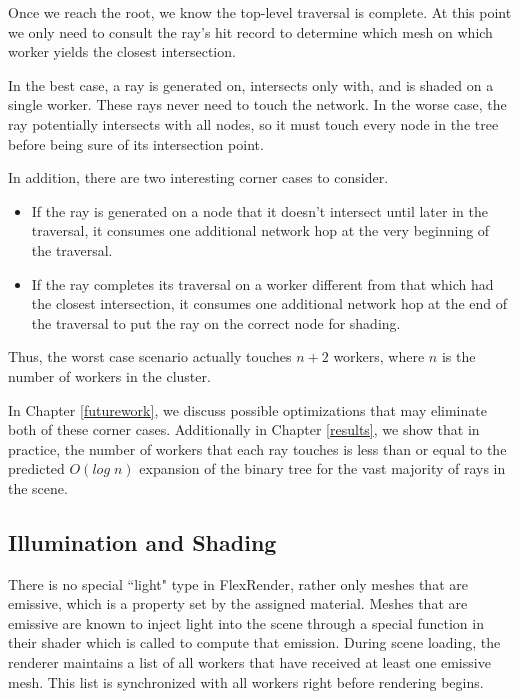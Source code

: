 \documentclass[12pt]{ucthesis}
\begin{document}
Once we reach the root, we know the top-level traversal is complete. At this
point we only need to consult the ray's hit record to determine which mesh on
which worker yields the closest intersection.

In the best case, a ray is generated on, intersects only with, and is shaded on
a single worker. These rays never need to touch the network. In the worse case,
the ray potentially intersects with all nodes, so it must touch every node in
the tree before being sure of its intersection point.

In addition, there are two interesting corner cases to consider.

\begin{itemize}
    \item If the ray is generated on a node that it doesn't intersect until
        later in the traversal, it consumes one additional network hop at the
        very beginning of the traversal.
    \item If the ray completes its traversal on a worker different from that
        which had the closest intersection, it consumes one additional network hop
        at the end of the traversal to put the ray on the correct node for
        shading.
\end{itemize}

Thus, the worst case scenario actually touches $n + 2$ workers, where $n$ is the
number of workers in the cluster.

In Chapter \ref{futurework}, we discuss possible optimizations that may eliminate
both of these corner cases. Additionally in Chapter \ref{results}, we show that
in practice, the number of workers that each ray touches is less than or equal
to the predicted $O(log\;n)$ expansion of the binary tree for the vast majority
of rays in the scene.

\subsection{Illumination and Shading}
\label{shading}

There is no special ``light" type in FlexRender, rather only meshes that are
emissive, which is a property set by the assigned material. Meshes that are
emissive are known to inject light into the scene through a special function in
their shader which is called to compute that emission. During scene loading,
the renderer maintains a list of all workers that have received at least one
emissive mesh. This list is synchronized with all workers right before
rendering begins.
\end{document}
